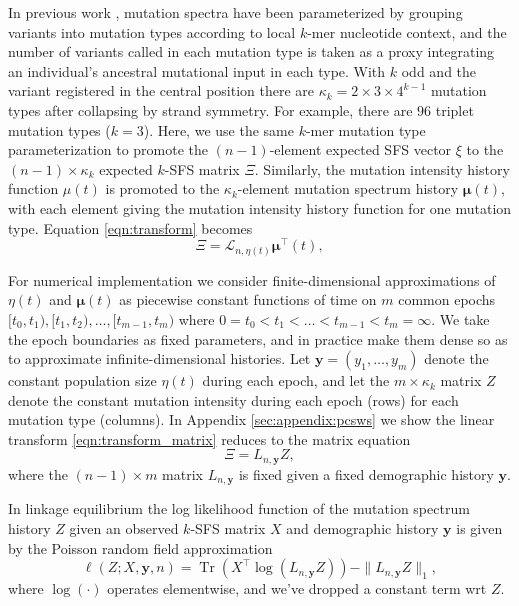 \documentclass[11pt]{article}
\DeclareMathOperator{\Tr}{Tr}
\begin{document}
In previous work \cite{Kelley, cancer, etc}, mutation spectra have been parameterized by grouping variants into mutation types according to local $k$-mer nucleotide context, and the number of variants called in each mutation type is taken as a proxy integrating an individual's ancestral mutational input in each type.
With $k$ odd and the variant registered in the central position there are $\kappa_k=2\times3\times4^{k-1}$ mutation types after collapsing by strand symmetry.
For example, there are $96$ triplet mutation types ($k=3$).
Here, we use the same $k$-mer mutation type parameterization to promote the $(n-1)$-element expected SFS vector $\xi$ to the $(n-1)\times\kappa_k$ expected $k$-SFS matrix $\Xi$.
Similarly, the mutation intensity history function $\mu(t)$ is promoted to the $\kappa_k$-element mutation spectrum history $\boldsymbol\mu(t)$, with each element giving the mutation intensity history function for one mutation type.
Equation \eqref{eqn:transform} becomes
\begin{equation}
  \label{eqn:transform_matrix}
\Xi = \mathcal{L}_{n,\eta(t)}\boldsymbol\mu^\intercal(t),
\end{equation}

For numerical implementation we consider finite-dimensional approximations of $\eta(t)$ and $\boldsymbol\mu(t)$ as piecewise constant functions of time on $m$ common epochs $[t_0, t_1), [t_1, t_2),\dots, [t_{m-1}, t_m)$ where $0=t_0 < t_1 < \dots < t_{m-1} < t_m=\infty$.
We take the epoch boundaries as fixed parameters, and in practice make them dense so as to approximate infinite-dimensional histories.
Let $\boldsymbol y = (y_1,\dots,y_m)$ denote the constant population size $\eta(t)$ during each epoch, and let the $m\times\kappa_k$ matrix $Z$ denote the constant mutation intensity during each epoch (rows) for each mutation type (columns).
In Appendix \ref{sec:appendix:pcsws} we show the linear transform \eqref{eqn:transform_matrix} reduces to the matrix equation
\begin{equation}
\label{eqn:transform_discrete}
\Xi = L_{n, \boldsymbol y} Z,
\end{equation}
where the $(n-1)\times m$ matrix $L_{n, \boldsymbol y}$ is fixed given a fixed demographic history $\boldsymbol y$.

In linkage equilibrium the log likelihood function of the mutation spectrum history $Z$ given an observed $k$-SFS matrix $X$ and demographic history $\boldsymbol y$ is given by the Poisson random field approximation \cite{?}
\[
\ell(Z; X, \boldsymbol y, n) = \Tr(X^\intercal\log(L_{n, \boldsymbol y} Z)) - \|L_{n, \boldsymbol y} Z\|_1,
\]
where $\log(\cdot)$ operates elementwise, and we've dropped a constant term wrt $Z$.
\end{document}
